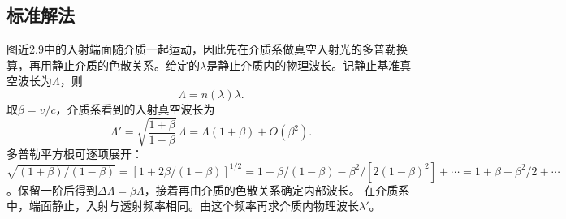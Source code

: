 \documentclass[UTF8,fontset=fandol,a4paper,11pt]{ctexart}
\begin{document}


\subsection*{标准解法}


图近2.9中的入射端面随介质一起运动，因此先在介质系做真空入射光的多普勒换算，再用静止介质的色散关系。给定的$\lambda$是静止介质内的物理波长。记静止基准真空波长为$\Lambda$，则
\[
\Lambda=n(\lambda)\lambda.
\]
取$\beta=v/c$，介质系看到的入射真空波长为
\[
\Lambda'=\sqrt{\frac{1+\beta}{1-\beta}}\,\Lambda
=\Lambda(1+\beta)+O(\beta^2).
\]
多普勒平方根可逐项展开：$\sqrt{(1+\beta)/(1-\beta)}=[1+2\beta/(1-\beta)]^{1/2}=1+\beta/(1-\beta)-\beta^2/[2(1-\beta)^2]+\cdots=1+\beta+\beta^2/2+\cdots$。保留一阶后得到$\Delta\Lambda=\beta\Lambda$，接着再由介质的色散关系确定内部波长。
在介质系中，端面静止，入射与透射频率相同。由这个频率再求介质内物理波长$\lambda'$。
\end{document}
